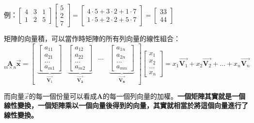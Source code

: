 \documentclass[11pt]{article}
\begin{document}
{例：\(\begin{bmatrix}4 & 3 & 1 \\ 1 & 2 & 5\end{bmatrix} \begin{bmatrix}5 \\ 2 \\ 7\end{bmatrix} = \begin{bmatrix}4\cdot 5 + 3\cdot 2 + 1\cdot 7 \\ 1 \cdot 5 + 2 \cdot 2 + 5 \cdot 7\end{bmatrix} = \begin{bmatrix}33 \\ 44\end{bmatrix}\)

    矩陣的向量積，可以當作時矩陣的所有列向量的線性組合：
\(\underset { m\times n }{ \mathbf{A} } \vec { \mathbf{x} } =\begin{bmatrix} \underbrace { \begin{bmatrix} a_{ 11 } \\ a_{ 21 } \\ \ldots \\ a_{ m1 } \end{bmatrix} }_{ \vec { \mathbf{ V }_{ 1 } } } & \underbrace { \begin{bmatrix} a_{ 12 } \\ a_{ 22 } \\\ldots \\ a_{ m2 } \end{bmatrix} }_{ \vec { \mathbf{ V_{ 2 } } } } & \ldots & \underbrace { \begin{bmatrix} a_{ 1n } \\ a_{ 2n } \\ \ldots \\ a_{ mn } \end{bmatrix} }_{ \vec { \mathbf{ V_{ n } } } } \end{bmatrix}\begin{bmatrix} x_{ 1 } \\ x_{ 2 } \\ \ldots \\ x_{ n } \end{bmatrix}=x_1\vec{\mathbf{V}_1}+x_2\vec{\mathbf{V}_2}+\ldots+x_n\vec{\mathbf{V}_n}\)

    而向量\(\vec{x}\)的每一個份量可以看成\(\mathbf{A}\)的每一個列向量的加權。\textbf{一個矩陣其實就是一個線性變換，一個矩陣乘以一個向量後得到的向量，其實就相當於將這個向量進行了線性變換。}

}
\end{document}

